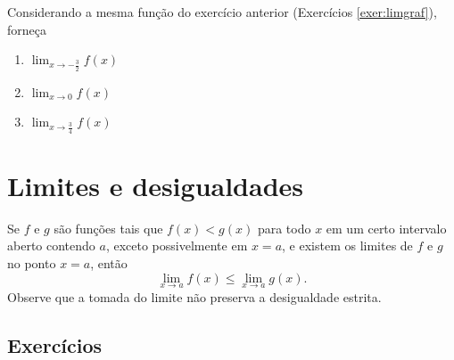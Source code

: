 \begin{exer}
  Considerando a mesma função do exercício anterior (Exercícios \ref{exer:limgraf}), forneça
  \begin{enumerate}
  \item $\displaystyle \lim_{x\to -\frac{3}{2}} f(x)$
  \item $\displaystyle \lim_{x\to 0} f(x)$
  \item $\displaystyle \lim_{x\to \frac{3}{4}} f(x)$
  \end{enumerate}
\end{exer}

\emconstrucao

\section{Limites e desigualdades}\label{cap_lim_sec_limdes}

Se $f$ e $g$ são funções tais que $f(x)<g(x)$ para todo $x$ em um certo intervalo aberto contendo $a$, exceto possivelmente em $x=a$, e existem os limites de $f$ e $g$ no ponto $x=a$, então
\begin{equation}
  \lim_{x\to a} f(x) \leq \lim_{x\to a} g(x).
\end{equation}
Observe que a tomada do limite não preserva a desigualdade estrita.

\subsection*{Exercícios}

\emconstrucao



